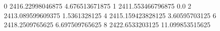 0 2416.22998046875 4.676513671875
1 2411.553466796875 0.0
2 2413.089599609375 1.5361328125
4 2415.159423828125 3.60595703125
6 2418.2509765625 6.697509765625
8 2422.6533203125 11.099853515625
